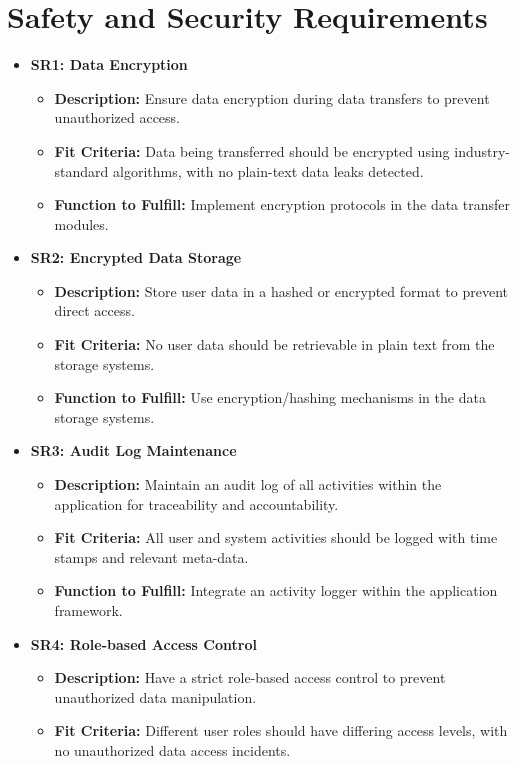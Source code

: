 \documentclass{article}
\begin{document}
\section{Safety and Security Requirements}
\begin{itemize}
\item \textbf{SR1: Data Encryption}
  \begin{itemize}
  \item \textbf{Description:} Ensure data encryption during data transfers to prevent unauthorized access.
  \item \textbf{Fit Criteria:} Data being transferred should be encrypted using industry-standard algorithms, with no plain-text data leaks detected.
  \item \textbf{Function to Fulfill:} Implement encryption protocols in the data transfer modules.
  \end{itemize}
\item \textbf{SR2: Encrypted Data Storage}
  \begin{itemize}
  \item \textbf{Description:} Store user data in a hashed or encrypted format to prevent direct access.
  \item \textbf{Fit Criteria:} No user data should be retrievable in plain text from the storage systems.
  \item \textbf{Function to Fulfill:} Use encryption/hashing mechanisms in the data storage systems.
  \end{itemize}
\item \textbf{SR3: Audit Log Maintenance}
  \begin{itemize}
  \item \textbf{Description:} Maintain an audit log of all activities within the application for traceability and accountability.
  \item \textbf{Fit Criteria:} All user and system activities should be logged with time stamps and relevant meta-data.
  \item \textbf{Function to Fulfill:} Integrate an activity logger within the application framework.
  \end{itemize}
\item \textbf{SR4: Role-based Access Control}
  \begin{itemize}
  \item \textbf{Description:} Have a strict role-based access control to prevent unauthorized data manipulation.
  \item \textbf{Fit Criteria:} Different user roles should have differing access levels, with no unauthorized data access incidents.

\end{itemize}
\end{itemize}
\end{document}
